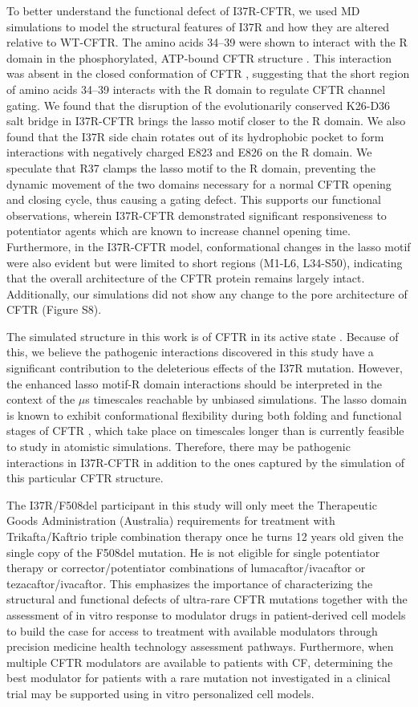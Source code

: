To better understand the functional defect of I37R-CFTR, we used MD simulations to model the structural features of I37R and how they are altered relative to WT-CFTR. The amino acids 34–39 were shown to interact with the R domain in the phosphorylated, ATP-bound CFTR structure \cite{zhang2018a}. This interaction was absent in the closed conformation of CFTR \cite{zhang2016}, suggesting that the short region of amino acids 34–39 interacts with the R domain to regulate CFTR channel gating. We found that the disruption of the evolutionarily conserved K26-D36 salt bridge in I37R-CFTR brings the lasso motif closer to the R domain. We also found that the I37R side chain rotates out of its hydrophobic pocket to form interactions with negatively charged E823 and E826 on the R domain. We speculate that R37 clamps the lasso motif to the R domain, preventing the dynamic movement of the two domains necessary for a normal CFTR opening and closing cycle, thus causing a gating defect. This supports our functional observations, wherein I37R-CFTR demonstrated significant responsiveness to potentiator agents which are known to increase channel opening time. Furthermore, in the I37R-CFTR model, conformational changes in the lasso motif were also evident but were limited to short regions (M1-L6, L34-S50), indicating that the overall architecture of the CFTR protein remains largely intact. Additionally, our simulations did not show any change to the pore architecture of CFTR (Figure S8).

The simulated structure in this work is of CFTR in its active state \cite{zhang2018a}. Because of this, we believe the pathogenic interactions discovered in this study have a significant contribution to the deleterious effects of the I37R mutation. However, the enhanced lasso motif-R domain interactions should be interpreted in the context of the $\mu$s timescales reachable by unbiased simulations. The lasso domain is known to exhibit conformational flexibility during both folding and functional stages of CFTR \cite{kleizen2021}, which take place on timescales longer than is currently feasible to study in atomistic simulations. Therefore, there may be pathogenic interactions in I37R-CFTR in addition to the ones captured by the simulation of this particular CFTR structure.

The I37R/F508del participant in this study will only meet the Therapeutic Goods Administration (Australia) requirements for treatment with Trikafta/Kaftrio triple combination therapy once he turns 12 years old given the single copy of the F508del mutation. He is not eligible for single potentiator therapy or corrector/potentiator combinations of lumacaftor/ivacaftor or tezacaftor/ivacaftor. This emphasizes the importance of characterizing the structural and functional defects of ultra-rare CFTR mutations together with the assessment of in vitro response to modulator drugs in patient-derived cell models to build the case for access to treatment with available modulators through precision medicine health technology assessment pathways. Furthermore, when multiple CFTR modulators are available to patients with CF, determining the best modulator for patients with a rare mutation not investigated in a clinical trial may be supported using in vitro personalized cell models.


